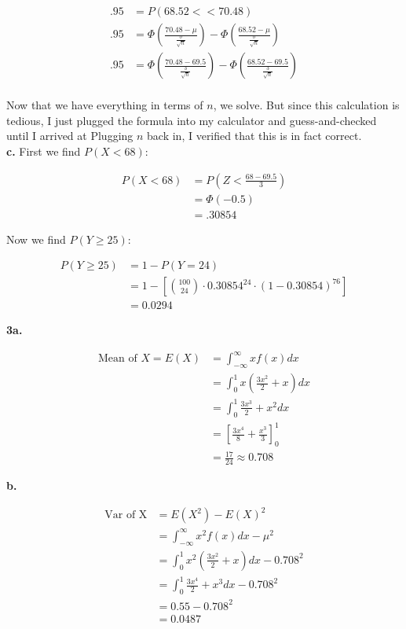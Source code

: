 \documentclass[12pt]{report}
\makeatletter
\newcommand*{\Xbar}{}%
\DeclareRobustCommand*{\Xbar}{%
	\mathpalette\@Xbar{}%
}
\newcommand*{\@Xbar}[2]{%
	\sbox0{$#1\mathrm{X}\m@th$}%
	\sbox2{$#1X\m@th$}%
	\rlap{%
		\hbox to\wd2{%
			\hfill
			$\overline{%
				\vrule width 0pt height\ht0 %
				\kern\wd0 %
			}$%
		}%
	}%
	\copy2 %
}
\makeatother
\begin{document}
\begin{align*}
	.95 &= P(68.52 < \Xbar < 70.48)\\
	.95 &= \Phi\left(\frac{70.48-\mu}{\frac{\sigma}{\sqrt{n}}}\right) - \Phi\left(\frac{68.52-\mu}{\frac{\sigma}{\sqrt{n}}}\right)\\
	.95 &= \Phi\left(\frac{70.48 - 69.5}{\frac{3}{\sqrt{n}}}\right) - \Phi\left(\frac{68.52-69.5}{\frac{3}{\sqrt{n}}}\right)\\
\end{align*}

\noindent Now that we have everything in terms of $n$, we solve. But since this calculation is tedious, I just plugged the formula into my calculator and guess-and-checked until I arrived at  Plugging $n$ back in, I verified that this is in fact correct.\\

\pagebreak
\noindent \textbf{c.} First we find $P(X < 68)$:

\begin{align*}
	P(X < 68) &= P\left(Z < \frac{68 - 69.5}{3}\right)\\
	&= \Phi(-0.5)\\
	&= .30854
\end{align*}

\noindent Now we find $P(Y \geq 25)$:

\begin{align*}
	P(Y \geq 25) &= 1 - P(Y = 24)\\
	&= 1 - \left[{100 \choose 24} \cdot 0.30854^{24} \cdot (1-0.30854)^{76}\right]\\
	&= \boxed{0.0294}
\end{align*}

\noindent \textbf{3a.} 

\begin{align*}
	\text{Mean of }X = E(X) &= \int_{-\infty}^{\infty}xf(x)dx\\
	&= \int_{0}^{1}x\left(\frac{3x^2}{2} + x\right)dx\\
	&= \int_{0}^{1}\frac{3x^3}{2} + x^2dx\\
	&= \left[\frac{3x^4}{8} + \frac{x^3}{3}\right]_0^1\\
	&= \boxed{\frac{17}{24} \approx 0.708}
\end{align*}

\pagebreak
\noindent \textbf{b.} 

\begin{align*}
	\text{Var of X} &= E(X^2) - E(X)^2\\
	&= \int_{-\infty}^{\infty} x^2 f(x)dx - \mu^2\\
	&= \int_{0}^{1} x^2\left(\frac{3x^2}{2} + x\right)dx - 0.708^2\\
	&= \int_{0}^{1}\frac{3x^4}{2} + x^3dx - 0.708^2\\
	&= 0.55 - 0.708^2\\
	&= \boxed{0.0487}
\end{align*}
\end{document}
